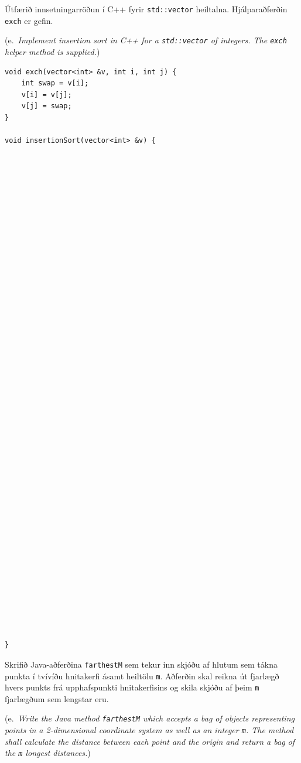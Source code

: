 \documentclass[addpoints]{exam}
\newcommand{\eng}[1]{(e.\ \emph{#1})}
\begin{document}
\begin{questions}



\question[4] Útfærið innsetningarröðun í C++ fyrir \texttt{std::vector} heiltalna. Hjálparaðferðin \texttt{exch} er gefin.

\eng{Implement insertion sort in C++ for a \texttt{std::vector} of integers. The \texttt{exch} helper method is supplied.}

\begin{verbatim}
void exch(vector<int> &v, int i, int j) {
    int swap = v[i];
    v[i] = v[j];
    v[j] = swap;
}

void insertionSort(vector<int> &v) {











































}
\end{verbatim}

\newpage
\question[4] Skrifið Java-aðferðina \texttt{farthestM} sem tekur inn skjóðu af hlutum sem tákna punkta í tvívíðu hnitakerfi ásamt heiltölu \texttt{m}. Aðferðin skal reikna út fjarlægð hvers punkts frá upphafspunkti hnitakerfisins og skila skjóðu af þeim \texttt{m} fjarlægðum sem lengstar eru.

\eng{Write the Java method \texttt{farthestM} which accepts a bag of objects representing points in a 2-dimensional coordinate system as well as an integer \texttt{m}. The method shall calculate the distance between each point and the origin and return a bag of the \texttt{m} longest distances.}


\end{questions}
\end{document}
